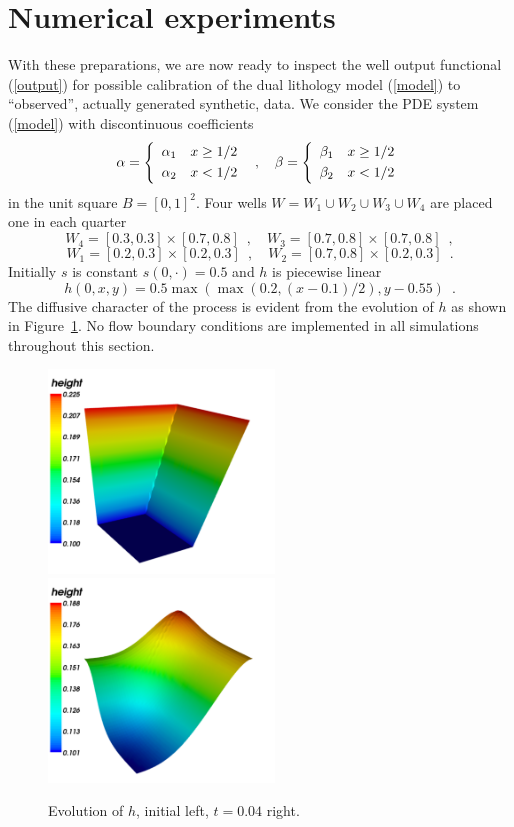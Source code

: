 \section{Numerical experiments}

With these preparations, we are now ready to inspect the well output functional (\ref{output})
for possible calibration of the dual lithology model (\ref{model}) to ``observed'',
actually generated synthetic, data.
We consider the PDE system (\ref{model}) with discontinuous coefficients
$$
 \alpha = \left\{
 \begin{array}{rl} \alpha_1 & x \ge 1/2 \\[\jot] \alpha_2 & x < 1/2 \end{array}
 \right .
 \enspace , \quad
 \beta = \left\{
 \begin{array}{rl} \beta_1 & x \ge 1/2 \\[\jot] \beta_2 & x < 1/2 \end{array}
 \right .
$$
in the unit square $B=[0,1]^2$.
Four wells $W = W_1 \cup W_2 \cup W_3 \cup W_4$
are placed one in each quarter
$$
 W_4 = [0.3, 0.3] \times [0.7, 0.8] \enspace, \quad
 W_3 = [0.7, 0.8] \times [0.7, 0.8] \enspace,
$$
$$
 W_1 = [0.2, 0.3] \times [0.2, 0.3] \enspace, \quad
 W_2 = [0.7, 0.8] \times [0.2, 0.3] \enspace.
$$
Initially $s$ is constant $s(0,\cdot)=0.5$ and $h$ is piecewise linear
$$
 h(0,x,y) = 0.5 \max(\max(0.2, (x-0.1)/2), y-0.55) \enspace .
$$
The diffusive character of the process is evident from the evolution of $h$ as shown in Figure~\ref{fig1}.
No flow boundary conditions are implemented in all simulations throughout this section.
\begin{figure}
  \begin{center}
    \includegraphics[width=6cm]{chapters/schroll/pdf/h0_typical.pdf}
    \includegraphics[width=6cm]{chapters/schroll/pdf/h_typical.pdf}
  \end{center}
    \caption{Evolution of $h$, initial left, $t=0.04$ right.  \label{fig1}}
\end{figure}

